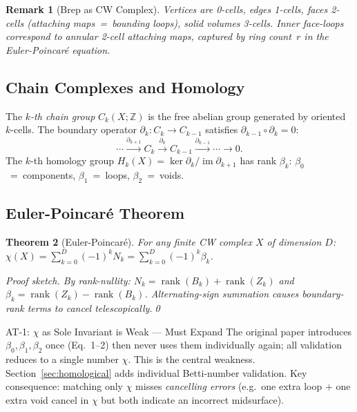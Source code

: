 \documentclass[journal,twocolumn,10pt]{IEEEtran}
\newtheorem{theorem}{Theorem}[section]
\newtheorem{remark}[theorem]{Remark}
\newcommand{\Hk}[1]{H_{#1}}
\newcommand{\Betti}[1]{\beta_{#1}}
\newcommand{\Euler}{\chi}
\newcommand{\bdry}{\partial}
\newcommand{\Ck}[1]{C_{#1}}
\newcommand{\Zk}[1]{Z_{#1}}
\newcommand{\Bk}[1]{B_{#1}}
\begin{document}
\begin{remark}[Brep as CW Complex]
Vertices are 0-cells, edges 1-cells, faces 2-cells (attaching maps~=~bounding
loops), solid volumes 3-cells. Inner face-loops correspond to annular 2-cell
attaching maps, captured by ring count~$r$ in the Euler-Poincar\'e equation.
\end{remark}

\subsection{Chain Complexes and Homology}

The \emph{$k$-th chain group} $\Ck{k}(X;\mathbb{Z})$ is the free abelian
group generated by oriented $k$-cells. The boundary operator
$\bdry_k:\Ck{k}\to\Ck{k-1}$ satisfies $\bdry_{k-1}\circ\bdry_k=0$:
\[
  \cdots \xrightarrow{\bdry_{k+1}} \Ck{k}
         \xrightarrow{\bdry_k}     \Ck{k-1}
         \xrightarrow{\bdry_{k-1}} \cdots \to 0.
\]
The $k$-th homology group $\Hk{k}(X)=\ker\bdry_k/\operatorname{im}\bdry_{k+1}$
has rank $\Betti{k}$:
$\Betti{0}$~=~components, $\Betti{1}$~=~loops, $\Betti{2}$~=~voids.

\subsection{Euler-Poincar\'e Theorem}

\begin{theorem}[Euler-Poincar\'e]\label{thm:ep}
For any finite CW complex $X$ of dimension $D$:
$\Euler(X)=\sum_{k=0}^{D}(-1)^k N_k=\sum_{k=0}^{D}(-1)^k\Betti{k}$.
\begin{proof}[Proof sketch]
By rank-nullity: $N_k=\operatorname{rank}(\Bk{k})+\operatorname{rank}(\Zk{k})$
and $\Betti{k}=\operatorname{rank}(\Zk{k})-\operatorname{rank}(\Bk{k})$.
Alternating-sign summation causes boundary-rank terms to cancel
telescopically.\qed
\end{proof}
\end{theorem}

\begin{atblock}{AT-1: $\Euler$ as Sole Invariant is Weak --- Must Expand}
The original paper introduces $\beta_0,\beta_1,\beta_2$ once (Eq.~1--2) then
never uses them individually again; all validation reduces to a single number
$\Euler$. This is the central weakness. Section~\ref{sec:homological} adds
individual Betti-number validation. Key consequence: matching only $\Euler$
misses \emph{cancelling errors} (e.g.\ one extra loop $+$ one extra void
cancel in $\Euler$ but both indicate an incorrect midsurface).
\end{atblock}
\end{document}
